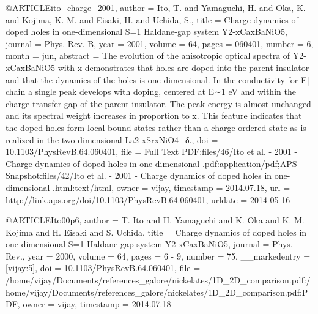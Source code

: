 @ARTICLE{ito_charge_2001,
  author = {Ito, T. and Yamaguchi, H. and Oka, K. and Kojima, K. M. and Eisaki,
	H. and Uchida, S.},
  title = {Charge dynamics of doped holes in one-dimensional S=1 Haldane-gap
	system Y2-{xCaxBaNiO5}},
  journal = {Phys. Rev. B},
  year = {2001},
  volume = {64},
  pages = {060401},
  number = {6},
  month = jun,
  abstract = {The evolution of the anisotropic optical spectra of Y2-{xCaxBaNiO5}
	with x demonstrates that holes are doped into the parent insulator
	and that the dynamics of the holes is one dimensional. In the conductivity
	for E‖ chain a single peak develops with doping, centered at E∼1
	{eV} and within the charge-transfer gap of the parent insulator.
	The peak energy is almost unchanged and its spectral weight increases
	in proportion to x. This feature indicates that the doped holes form
	local bound states rather than a charge ordered state as is realized
	in the two-dimensional La2-{xSrxNiO4+δ.}},
  doi = {10.1103/PhysRevB.64.060401},
  file = {Full Text PDF:files/46/Ito et al. - 2001 - Charge dynamics of doped holes in one-dimensional .pdf:application/pdf;APS Snapshot:files/42/Ito et al. - 2001 - Charge dynamics of doped holes in one-dimensional .html:text/html},
  owner = {vijay},
  timestamp = {2014.07.18},
  url = {http://link.aps.org/doi/10.1103/PhysRevB.64.060401},
  urldate = {2014-05-16}
}

@ARTICLE{Ito00p6,
  author = {T. Ito and H. Yamaguchi and K. Oka and K. M. Kojima and H. Eisaki
	and S. Uchida},
  title = {Charge dynamics of doped holes in one-dimensional S=1 Haldane-gap
	system Y2-xCaxBaNiO5},
  journal = {Phys. Rev.},
  year = {2000},
  volume = {64},
  pages = {6 - 9},
  number = {75},
  __markedentry = {[vijay:5]},
  doi = {10.1103/PhysRevB.64.060401},
  file = {/home/vijay/Documents/references_galore/nickelates/1D_2D_comparison.pdf:/home/vijay/Documents/references_galore/nickelates/1D_2D_comparison.pdf:PDF},
  owner = {vijay},
  timestamp = {2014.07.18}
}

